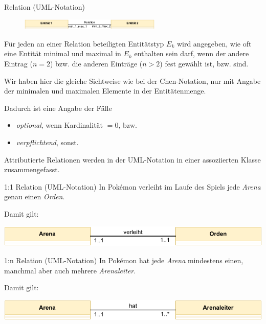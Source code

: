 \begin{defi}{Relation (UML-Notation)}
    \begin{figure}
        \begin{center}
            \includegraphics[width=0.6\textwidth]{includes/figures/definition_uml_relation.pdf}
        \end{center}
    \end{figure}
    Für jeden an einer Relation beteiligten Entitätstyp $E_k$ wird angegeben, wie oft eine Entität minimal und maximal in $E_k$ enthalten sein darf, wenn der andere Eintrag ($n=2$) bzw. die anderen Einträge ($n>2$) fest gewählt ist, bzw. sind.

    Wir haben hier die gleiche Sichtweise wie bei der Chen-Notation, nur mit Angabe der minimalen und maximalen Elemente in der Entitätenmenge.

    Dadurch ist eine Angabe der Fälle
    \begin{itemize}
        \item \emph{optional}, wenn Kardinalität $= 0$, bzw.
        \item \emph{verpflichtend}, sonst.
    \end{itemize}

    Attributierte Relationen werden in der UML-Notation in einer assoziierten Klasse zusammengefasst.
\end{defi}

\newpage

\begin{example}{1:1 Relation (UML-Notation)}
    In Pokémon verleiht im Laufe des Spiels jede \emph{Arena} genau einen \emph{Orden}.

    Damit gilt:
    \begin{center}
        \includegraphics[width=0.7\linewidth]{includes/figures/example_entity_relationship_modell_uml_one_to_one.pdf}
    \end{center}
\end{example}

\begin{example}{1:n Relation (UML-Notation)}
    In Pokémon hat jede \emph{Arena} mindestens einen, manchmal aber auch mehrere \emph{Arenaleiter}.

    Damit gilt:
    \begin{center}
        \includegraphics[width=0.7\linewidth]{includes/figures/example_entity_relationship_modell_uml_one_to_many.pdf}
    \end{center}
\end{example}

